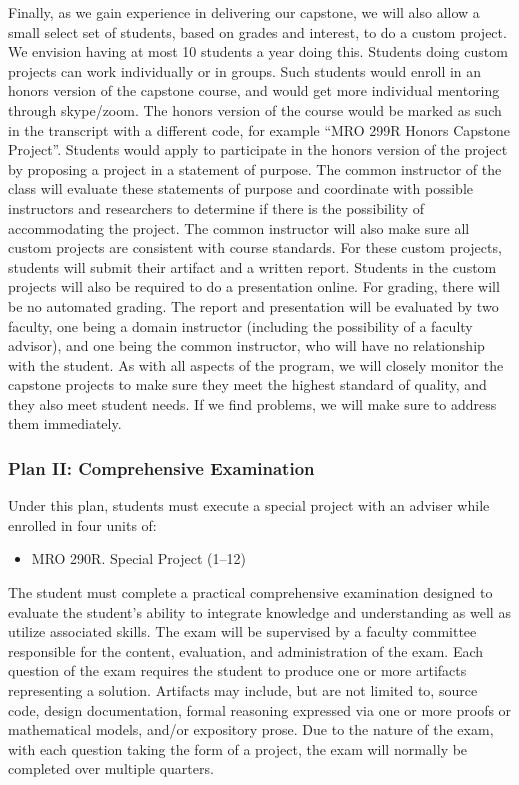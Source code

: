 \documentclass[11pt,letterpaper]{article}
\begin{document}
Finally, as we gain experience in delivering our capstone, we will
also allow a small select set of students, based on grades and
interest, to do a custom project. We envision having at most 10
students a year doing this. Students doing custom projects can work
individually or in groups. Such students would enroll in an honors
version of the capstone course, and would get more individual
mentoring through skype/zoom. The honors version of the course would
be marked as such in the transcript with a different code, for example
“MRO 299R Honors Capstone Project”. Students would apply to
participate in the honors version of the project by proposing a
project in a statement of purpose. The common instructor of the class
will evaluate these statements of purpose and coordinate with possible
instructors and researchers to determine if there is the possibility
of accommodating the project. The common instructor will also make
sure all custom projects are consistent with course standards. For
these custom projects, students will submit their artifact and a
written report. Students in the custom projects will also be required
to do a presentation online. For grading, there will be no automated
grading. The report and presentation will be evaluated by two faculty,
one being a domain instructor (including the possibility of a faculty
advisor), and one being the common instructor, who will have no
relationship with the student. As with all aspects of the program, we
will closely monitor the capstone projects to make sure they meet the
highest standard of quality, and they also meet student needs. If we
find problems, we will make sure to address them immediately.


\subsubsection{Plan II: Comprehensive Examination}

Under this plan, students must execute a special project with an
adviser while enrolled in four units of:

\begin{itemize}
\item MRO 290R. Special Project  (1–12)
\end{itemize}

The student must complete a practical comprehensive examination
designed to evaluate the student’s ability to integrate knowledge and
understanding as well as utilize associated skills. The exam will be
supervised by a faculty committee responsible for the content,
evaluation, and administration of the exam. Each question of the exam
requires the student to produce one or more artifacts representing a
solution. Artifacts may include, but are not limited to, source code,
design documentation, formal reasoning expressed via one or more
proofs or mathematical models, and/or expository prose. Due to the
nature of the exam, with each question taking the form of a project,
the exam will normally be completed over multiple quarters.
\end{document}
